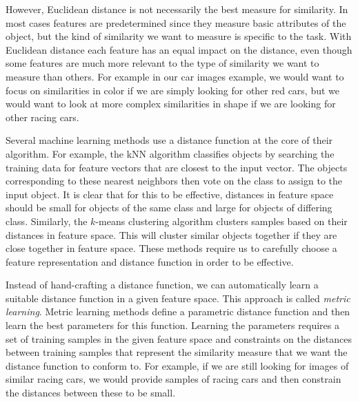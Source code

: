 However, Euclidean distance is not necessarily the best measure for similarity. In most cases features are predetermined since they measure basic attributes of the object, but the kind of similarity we want to measure is specific to the task. With Euclidean distance each feature has an equal impact on the distance, even though some features are much more relevant to the type of similarity we want to measure than others. For example in our car images example, we would want to focus on similarities in color if we are simply looking for other red cars, but we would want to look at more complex similarities in shape if we are looking for other racing cars. 

Several machine learning methods use a distance function at the core of their algorithm. For example, the \ac{kNN} algorithm classifies objects by searching the training data for feature vectors that are closest to the input vector. The objects corresponding to these nearest neighbors then vote on the class to assign to the input object. It is clear that for this to be effective, distances in feature space should be small for objects of the same class and large for objects of differing class. Similarly, the $k$-means clustering algorithm clusters samples based on their distances in feature space. This will cluster similar objects together if they are close together in feature space. These methods require us to carefully choose a feature representation and distance function in order to be effective.

Instead of hand-crafting a distance function, we can automatically learn a suitable distance function in a given feature space. This approach is called \emph{metric learning}. Metric learning methods define a parametric distance function and then learn the best parameters for this function. Learning the parameters requires a set of training samples in the given feature space  and constraints on the distances between training samples that represent the similarity measure that we want the distance function to conform to. For example, if we are still looking for images of similar racing cars, we would provide samples of racing cars and then constrain the distances between these to be small.


